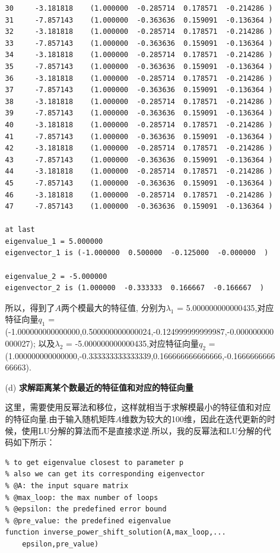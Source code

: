 \documentclass[12pt,a4paper,utf8]{ctexart}
\begin{document}
\begin{enumerate}
\begin{itemize}
\begin{lstlisting}
30     -3.181818    (1.000000  -0.285714  0.178571  -0.214286 )
31     -7.857143    (1.000000  -0.363636  0.159091  -0.136364 )
32     -3.181818    (1.000000  -0.285714  0.178571  -0.214286 )
33     -7.857143    (1.000000  -0.363636  0.159091  -0.136364 )
34     -3.181818    (1.000000  -0.285714  0.178571  -0.214286 )
35     -7.857143    (1.000000  -0.363636  0.159091  -0.136364 )
36     -3.181818    (1.000000  -0.285714  0.178571  -0.214286 )
37     -7.857143    (1.000000  -0.363636  0.159091  -0.136364 )
38     -3.181818    (1.000000  -0.285714  0.178571  -0.214286 )
39     -7.857143    (1.000000  -0.363636  0.159091  -0.136364 )
40     -3.181818    (1.000000  -0.285714  0.178571  -0.214286 )
41     -7.857143    (1.000000  -0.363636  0.159091  -0.136364 )
42     -3.181818    (1.000000  -0.285714  0.178571  -0.214286 )
43     -7.857143    (1.000000  -0.363636  0.159091  -0.136364 )
44     -3.181818    (1.000000  -0.285714  0.178571  -0.214286 )
45     -7.857143    (1.000000  -0.363636  0.159091  -0.136364 )
46     -3.181818    (1.000000  -0.285714  0.178571  -0.214286 )
47     -7.857143    (1.000000  -0.363636  0.159091  -0.136364 )

at last
eigenvalue_1 = 5.000000
eigenvector_1 is (-1.000000  0.500000  -0.125000  -0.000000  )

eigenvalue_2 = -5.000000
eigenvector_2 is (1.000000  -0.333333  0.166667  -0.166667  )
    \end{lstlisting}
    所以，得到了$A$两个模最大的特征值,
    分别为$\lambda_1$ = 5.000000000000435,对应特征向量$q_1$ = (-1.000000000000000,0.500000000000024,-0.124999999999987,-0.000000000000027);
    以及$\lambda_2$ = -5.000000000000435,对应特征向量$q_2$ = (1.000000000000000,-0.333333333333339,0.166666666666666,-0.166666666666663).

    \item[(d)] \textbf{求解距离某个数最近的特征值和对应的特征向量}
    \par
    这里，需要使用反幂法和移位，这样就相当于求解模最小的特征值和对应的特征向量.由于输入随机矩阵$A$维数为较大的100维，因此在迭代更新的时候，使用LU分解的算法而不是直接求逆.所以，我的反幂法和LU分解的代码如下所示：
    \begin{lstlisting}[frame=single]
% implement inverse-power and shift method
% to get eigenvalue closest to parameter p
% also we can get its corresponding eigenvector
% @A: the input square matrix
% @max_loop: the max number of loops
% @epsilon: the predefined error bound 
% @pre_value: the predefined eigenvalue
function inverse_power_shift_solution(A,max_loop,...
    epsilon,pre_value)


\end{lstlisting}
\end{itemize}
\end{enumerate}
\end{document}
